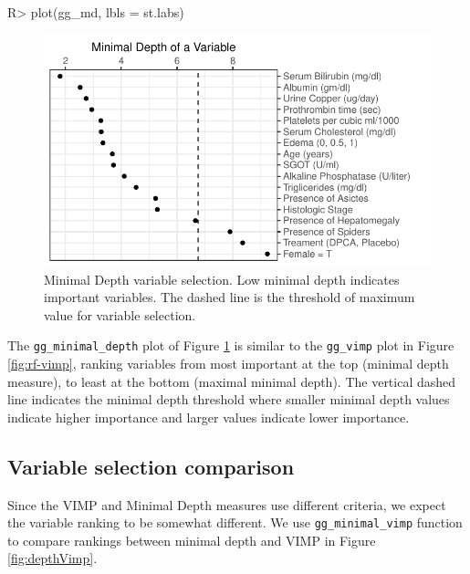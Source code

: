 \documentclass[article]{jss}
\begin{document}
\begin{Schunk}
\begin{Sinput}
R> plot(gg_md, lbls = st.labs)
\end{Sinput}
\begin{figure}[!htb]

{\centering \includegraphics{fig-rfs/rfs-mindepth-plot-1} 

}

\caption[Minimal Depth variable selection]{Minimal Depth variable selection. Low minimal depth indicates important variables. The dashed line is the threshold of maximum value for variable selection.}\label{fig:mindepth-plot}
\end{figure}
\end{Schunk}

The \texttt{gg\_minimal\_depth} plot of Figure \ref{fig:mindepth-plot}
is similar to the \texttt{gg\_vimp} plot in Figure \ref{fig:rf-vimp},
ranking variables from most important at the top (minimal depth
measure), to least at the bottom (maximal minimal depth). The vertical
dashed line indicates the minimal depth threshold where smaller minimal
depth values indicate higher importance and larger values indicate lower
importance.

\subsection{Variable selection
comparison}\label{variable-selection-comparison}

Since the VIMP and Minimal Depth measures use different criteria, we
expect the variable ranking to be somewhat different. We use
\texttt{gg\_minimal\_vimp} function to compare rankings between minimal
depth and VIMP in Figure \ref{fig:depthVimp}.
\end{document}
